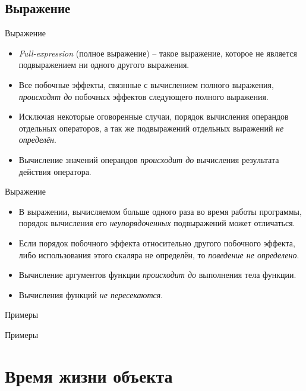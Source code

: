 \documentclass[xetex,mathserif,serif,10pt]{beamer}
\begin{document}
    \subsection{Выражение}
    \begin{frame}{Выражение}
        \begin{itemize}
            \item \textit{Full-expression} (полное выражение) -- такое выражение, которое не является подвыражением ни одного другого выражения.
            \item Все побочные эффекты, связнные с вычислением полного выражения, \textit{происходят до} побочных эффектов следующего полного выражения.
            \item Исключая некоторые оговоренные случаи, порядок вычисления операндов отдельных операторов, а так же подвыражений отдельных выражений \textit{не определён}.
            \item Вычисление значений операндов \textit{происходит до} вычисления результата действия оператора.
        \end{itemize}
    \end{frame}
    \begin{frame}{Выражение}
        \begin{itemize}
            \item В выражении, вычисляемом больше одного раза во время работы программы, порядок вычисления его \textit{неупорядоченных} подвыражений может отличаться.
            \item Если порядок побочного эффекта относительно другого побочного эффекта, либо использования этого скаляра не определён, то \textit{поведение не определено}.
            \item Вычисление аргументов функции \textit{происходит до } выполнения тела функции.
            \item Вычисления функций \textit{не пересекаются}.
        \end{itemize}
    \end{frame}
    \begin{frame}{Примеры}
        
    \end{frame}
    \begin{frame}{Примеры}
        
    \end{frame}


    \section{Время жизни объекта}
\end{document}

